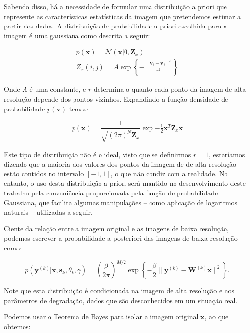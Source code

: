 \documentclass[12pt,openright,oneside,a4paper,english,brazil]{abntex2}
\begin{document}
Sabendo disso, há a necessidade de formular uma distribuição a priori que represente as características estatísticas da imagem que pretendemos estimar a partir dos dados.
A distribuição de probabilidade a priori escolhida para a imagem é uma gaussiana como descrita a seguir:

\begin{gather}
	p(\mathbf{x}) = \mathcal{N}(\mathbf{x} | 0, \mathbf{Z}_x) \\ 
	Z_x(i,j) = A \exp \left\{ - \frac{\|\mathbf{v}_i - \mathbf{v}_j \|^2}{r^2} \right\}
\end{gather}

Onde $A$ é uma constante, e $r$ determina o quanto cada ponto da imagem de alta resolução depende dos pontos vizinhos.
Expandindo a função densidade de probabilidade $p(\mathbf{x})$ temos:

\begin{equation}
	p(\mathbf{x}) = \frac{1}{\sqrt{(2\pi)^N \mathbf{Z}_x}}\exp{-\tfrac{1}{2} \mathbf{x}^T \mathbf{Z}_x \mathbf{x}}
\end{equation}

Este tipo de distribuição não é o ideal, visto que se definirmos $r=1$, estaríamos dizendo que a maioria dos valores dos pontos da imagem de de alta resolução estão contidos no intervalo $[-1,1]$, o que não condiz com a realidade.
No entanto, o uso desta distribuição a priori será mantido no desenvolvimento deste trabalho pela conveniência proporcionada pela função de probabilidade Gaussiana, que facilita algumas manipulações -- como aplicação de logaritmos naturais --  utilizadas a seguir.

Ciente da relação entre a imagem original e as imagens de baixa resolução, podemos escrever a probabilidade a posteriori das imagens de baixa resolução como:

\begin{equation}
	\label{eq:posterior0}
	p(\mathbf{y}^{(k)} | \mathbf{x}, \mathbf{s}_k, \theta_k, \gamma) = 
	\left(\frac{\beta}{2\pi}\right)^{M/2}
	\exp \left\{ -\frac{\beta}{2} \| \mathbf{y}^{(k)} - \mathbf{W}^{(k)} \mathbf{x} \|^2 \right\}.
\end{equation}

Note que esta distribuição é condicionada na imagem de alta resolução e nos parâmetros de degradação, dados que são desconhecidos em um situação real.

Podemos usar o Teorema de Bayes para isolar a imagem original $\mathbf{x}$, ao que obtemos:
\end{document}
